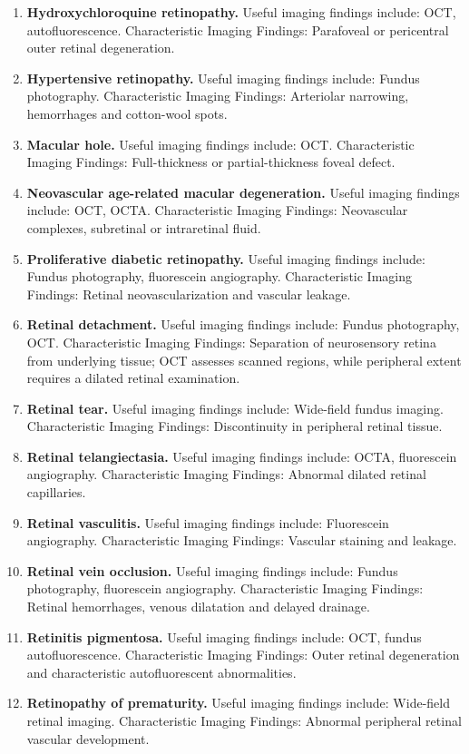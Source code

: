 \begin{enumerate}[leftmargin=*,itemsep=0.45em,topsep=0.4em]
\item \textbf{Hydroxychloroquine retinopathy.} Useful imaging findings include: OCT, autofluorescence. Characteristic Imaging Findings: Parafoveal or pericentral outer retinal degeneration.
\item \textbf{Hypertensive retinopathy.} Useful imaging findings include: Fundus photography. Characteristic Imaging Findings: Arteriolar narrowing, hemorrhages and cotton-wool spots.
\item \textbf{Macular hole.} Useful imaging findings include: OCT. Characteristic Imaging Findings: Full-thickness or partial-thickness foveal defect.
\item \textbf{Neovascular age-related macular degeneration.} Useful imaging findings include: OCT, OCTA. Characteristic Imaging Findings: Neovascular complexes, subretinal or intraretinal fluid.
\item \textbf{Proliferative diabetic retinopathy.} Useful imaging findings include: Fundus photography, fluorescein angiography. Characteristic Imaging Findings: Retinal neovascularization and vascular leakage.
\item \textbf{Retinal detachment.} Useful imaging findings include: Fundus photography, OCT. Characteristic Imaging Findings: Separation of neurosensory retina from underlying tissue; OCT assesses scanned regions, while peripheral extent requires a dilated retinal examination.
\item \textbf{Retinal tear.} Useful imaging findings include: Wide-field fundus imaging. Characteristic Imaging Findings: Discontinuity in peripheral retinal tissue.
\item \textbf{Retinal telangiectasia.} Useful imaging findings include: OCTA, fluorescein angiography. Characteristic Imaging Findings: Abnormal dilated retinal capillaries.
\item \textbf{Retinal vasculitis.} Useful imaging findings include: Fluorescein angiography. Characteristic Imaging Findings: Vascular staining and leakage.
\item \textbf{Retinal vein occlusion.} Useful imaging findings include: Fundus photography, fluorescein angiography. Characteristic Imaging Findings: Retinal hemorrhages, venous dilatation and delayed drainage.
\item \textbf{Retinitis pigmentosa.} Useful imaging findings include: OCT, fundus autofluorescence. Characteristic Imaging Findings: Outer retinal degeneration and characteristic autofluorescent abnormalities.
\item \textbf{Retinopathy of prematurity.} Useful imaging findings include: Wide-field retinal imaging. Characteristic Imaging Findings: Abnormal peripheral retinal vascular development.

\end{enumerate}
